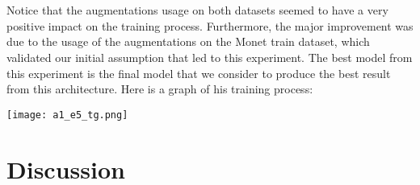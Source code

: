 \documentclass{article}
\begin{document}
\begin{table}[!ht]
    \centering
\end{table}
\\\\
Notice that the augmentations usage on both datasets seemed to have a very positive impact on the training process. Furthermore, the major improvement was due to the usage of the augmentations on the Monet train dataset, which validated our initial assumption that led to this experiment. The best model from this experiment is the final model that we consider to produce the best result from this architecture. Here is a graph of his training process:

\begin{center}
    \texttt{[image: a1\_e5\_tg.png]}
\end{center}

\section{Discussion}
\end{document}
